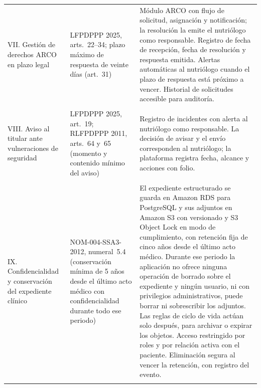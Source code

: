 \documentclass[12pt, a4paper]{article}
\begin{document}
\begin{longtable}{>{\raggedright\arraybackslash}p{2.8cm}
  >{\raggedright\arraybackslash}p{3.0cm}
  >{\raggedright\arraybackslash}p{8.5cm}}
  VII. Gestión de derechos ARCO en plazo legal
    & LFPDPPP 2025, arts.~22--34; plazo máximo de respuesta de
      veinte días (art.~31)
        & Módulo ARCO con flujo de solicitud, asignación y
      notificación; la resolución la emite el nutriólogo como
      responsable. Registro de fecha de
      recepción, fecha de resolución y respuesta emitida.
      Alertas automáticas al nutriólogo cuando el plazo de
      respuesta está próximo a vencer. Historial de solicitudes
      accesible para auditoría. \\
      \\[4pt]
      VIII. Aviso al titular ante vulneraciones de seguridad
    & LFPDPPP 2025, art.~19; RLFPDPPP 2011, arts.~64 y~65
      (momento y contenido mínimo del aviso)
    & Registro de incidentes con alerta al nutriólogo como
      responsable. La decisión de avisar y el envío corresponden
      al nutriólogo; la plataforma registra fecha, alcance y
      acciones con folio. \\
  \\[4pt]

  IX. Confidencialidad y conservación del expediente clínico
    & NOM-004-SSA3-2012, numeral~5.4 (conservación mínima de 5 años desde
      el último acto médico con confidencialidad durante todo
      ese periodo)
        & El expediente estructurado se guarda en Amazon RDS para
      PostgreSQL y sus adjuntos en Amazon S3 con versionado y S3
      Object Lock en modo de cumplimiento, con retención fija de
      cinco años desde el último acto médico. Durante ese periodo
      la aplicación no ofrece ninguna operación de borrado sobre el
      expediente y ningún usuario, ni con privilegios
      administrativos, puede borrar ni sobrescribir los adjuntos.
      Las reglas de ciclo de vida actúan solo después, para
      archivar o expirar los objetos. Acceso restringido por roles
      y por relación activa con el paciente. Eliminación segura al
      vencer la retención, con registro del evento. \\
  \\[4pt]


\end{longtable}
\end{document}
